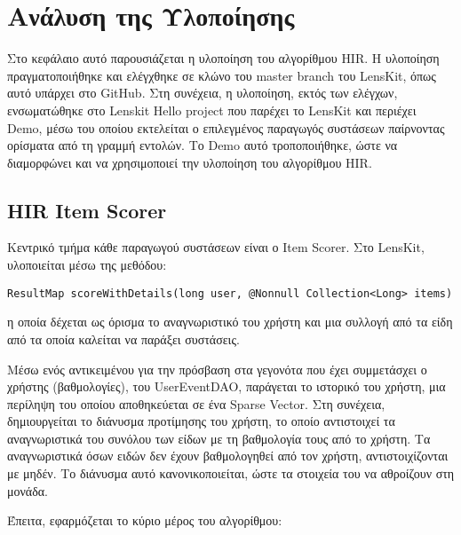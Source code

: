 \chapter{\el Ανάλυση της Υλοποίησης}
\label{Chapter5}
Στο κεφάλαιο αυτό παρουσιάζεται η υλοποίηση του αλγορίθμου {\en HIR}. Η υλοποί\-ηση πραγματοποιήθηκε και ελέγχθηκε σε κλώνο του {\en master branch} του {\en LensKit}, όπως αυτό υπάρχει στο {\en GitHub}. Στη συνέχεια, η υλοποίηση, εκτός των ελέγχων, ενσωματώθηκε στο {\en Lenskit Hello project} που παρέχει το {\en LensKit} και περιέχει {\en Demo}, μέσω του οποίου εκτελείται ο επιλεγμένος παραγωγός συστάσεων παίρνοντας ορίσματα από τη γραμμή εντολών. Το {\en Demo} αυτό τροποποιήθηκε, ώστε να διαμορφώνει και να χρησιμοποιεί την υλοποίηση του αλγορίθμου {\en HIR}.
\section{\en HIR Item Scorer}
Κεντρικό τμήμα κάθε παραγωγού συστάσεων είναι ο \en Item Scorer. \el Στο \en LensKit, \el υλοποιείται μέσω της μεθόδου:
\en \begin{footnotesize}
\begin{verbatim}
ResultMap scoreWithDetails(long user, @Nonnull Collection<Long> items)
\end{verbatim}
\end{footnotesize}
\el η οποία δέχεται ως όρισμα το αναγνωριστικό του χρήστη και μια συλλογή από τα είδη από τα οποία καλείται να παράξει συστάσεις. \par
Μέσω ενός αντικειμένου για την πρόσβαση στα γεγονότα που έχει συμμετάσχει ο χρήστης (βαθμολογίες), του \en UserEventDAO, \el παράγεται το ιστορικό του χρήστη, μια περίληψη του οποίου αποθηκεύεται σε ένα \en Sparse Vector. \el Στη συνέχεια, δημιουργείται το διάνυσμα προτίμησης του χρήστη, το οποίο αντιστοιχεί τα αναγνωριστικά του συνόλου των είδων με τη βαθμολογία τους από το χρήστη. Τα αναγνωριστικά όσων ειδών δεν έχουν βαθμολογηθεί από τον χρήστη, αντιστοιχίζονται με μηδέν. Το διάνυσμα αυτό κανονικοποιείται, ώστε τα στοιχεία του να αθροίζουν στη μονάδα. \par
Έπειτα, εφαρμόζεται το κύριο μέρος του αλγορίθμου:
